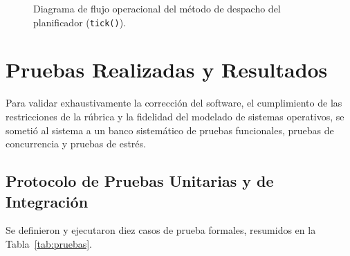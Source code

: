 \documentclass[11pt,letterpaper]{article}
\begin{document}
\begin{figure}[htbp]
\caption{Diagrama de flujo operacional del método de despacho del planificador (\texttt{tick()}).}
\label{fig:flujo_planificador}
\end{figure}

\section{Pruebas Realizadas y Resultados}

Para validar exhaustivamente la corrección del software, el cumplimiento de las restricciones de la rúbrica y la fidelidad del modelado de sistemas operativos, se sometió al sistema a un banco sistemático de pruebas funcionales, pruebas de concurrencia y pruebas de estrés.

\subsection{Protocolo de Pruebas Unitarias y de Integración}
Se definieron y ejecutaron diez casos de prueba formales, resumidos en la Tabla~\ref{tab:pruebas}.
\end{document}
